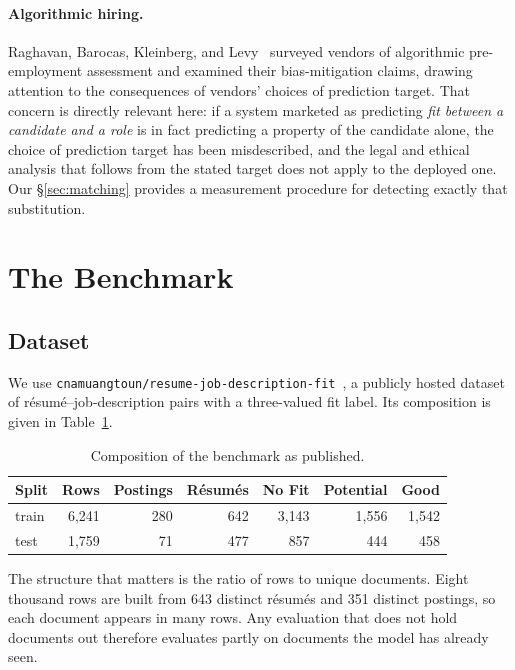 \documentclass[11pt]{article}                      %
\newcommand{\tabfont}{\footnotesize}
\begin{document}
\paragraph{Algorithmic hiring.}
Raghavan, Barocas, Kleinberg, and Levy~\cite{raghavan2020hiring} surveyed vendors
of algorithmic pre-employment assessment and examined their bias-mitigation
claims, drawing attention to the consequences of vendors' choices of prediction
target. That concern is directly relevant here: if a system marketed as
predicting \emph{fit between a candidate and a role} is in fact predicting a
property of the candidate alone, the choice of prediction target has been
misdescribed, and the legal and ethical analysis that follows from the stated
target does not apply to the deployed one. Our \S\ref{sec:matching} provides a
measurement procedure for detecting exactly that substitution.

\section{The Benchmark}

\subsection{Dataset}

We use \texttt{cnamuangtoun/resume-job-description-fit}~\cite{resumejobfit2024},
a publicly hosted dataset of résumé--job-description pairs with a three-valued
fit label. Its composition is given in Table~\ref{tab:dataset}.

\begin{table}[t]
\centering\tabfont
\caption{Composition of the benchmark as published.}
\label{tab:dataset}
\begin{tabular}{lrrrrrr}
\toprule
Split & Rows & Postings & Résumés & No Fit & Potential & Good \\
\midrule
train & 6{,}241 & 280 & 642 & 3{,}143 & 1{,}556 & 1{,}542 \\
test  & 1{,}759 &  71 & 477 &   857 &   444 &   458 \\
\bottomrule
\end{tabular}
\end{table}

The structure that matters is the ratio of rows to unique documents. Eight
thousand rows are built from 643 distinct résumés and 351 distinct postings, so
each document appears in many rows. Any evaluation that does not hold documents
out therefore evaluates partly on documents the model has already seen.
\end{document}

